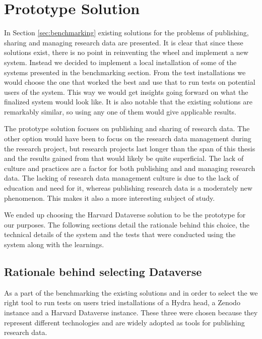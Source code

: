 \chapter{Prototype Solution}
\label{chapter:prototype}

In Section \ref{sec:benchmarking} existing solutions for the problems of
publishing, sharing and managing research data are presented. It is clear that
since these solutions exist, there is no point in reinventing the wheel and
implement a new system. Instead we decided to implement a local installation
of some of the systems presented in the benchmarking section. From the test
installations we would choose the one that worked the best and use that to
run tests on potential users of the system. This way we would get insights
going forward on what the finalized system would look like. It is also notable
that the existing solutions are remarkably similar, so using any one of them
would give applicable results.

The prototype solution focuses on publishing and sharing of research data. The
other option would have been to focus on the research data management during
the research project, but research projects last longer than the span of this
thesis and the results gained from that would likely be quite superficial.
The lack of culture and practices are a factor for both publishing and
and managing research data. The lacking of research data management culture is
due to the lack of education and need for it, whereas publishing research data
is a moderately new phenomenon. This makes it also a more interesting subject
of study.

We ended up choosing the Harvard Dataverse solution to be the prototype for our
purposes. The following sections detail the rationale behind this choice, the
technical details of the system and the tests that were conducted using the
system along with the learnings.

\section{Rationale behind selecting Dataverse}

As a part of the benchmarking the existing solutions and in order to select the
we right tool to run tests on users tried installations of a Hydra head, a
Zenodo instance and a Harvard Dataverse instance. These three were chosen
because they represent different technologies and are widely adopted as tools
for publishing research data.


